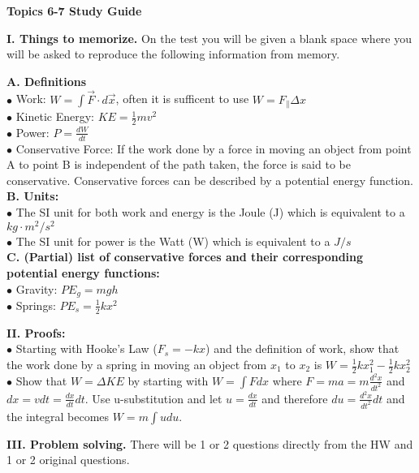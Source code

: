 \documentclass[11pt]{article}
\begin{document}
{\centering
\textbf{Topics 6-7 Study Guide} \par
\vspace{\baselineskip}
}

\textbf{I. Things to memorize.}
On the test you will be given a blank space where you will be asked to reproduce the following information from memory.
\vspace{0.5\baselineskip}

\begin{addmargin}[1em]{0em}%
\textbf{A. Definitions} \\
$\bullet$ Work: $W = \int \vec{F} \cdot d\vec{x}$, often it is sufficent to use $W = F_\parallel \Delta x$ \\
$\bullet$ Kinetic Energy: $KE = \frac{1}{2} m v^2$ \\
$\bullet$ Power: $P = \frac{dW}{dt}$ \\
$\bullet$ Conservative Force: If the work done by a force in moving an object from point A to point B is independent of the path taken, the force is said to be conservative. Conservative forces can be described by a potential energy function. \\

\textbf{B. Units:} \\
$\bullet$ The SI unit for both work and energy is the Joule (J) which is equivalent to a $kg \cdot m^2/s^2$ \\
$\bullet$ The SI unit for power is the Watt (W) which is equivalent to a $J/s$ \\

\textbf{C. (Partial) list of conservative forces and their corresponding potential energy functions:} \\
$\bullet$ Gravity: $PE_g = mgh$ \\
$\bullet$ Springs: $PE_s = \frac{1}{2}kx^2$
\end{addmargin}

\vspace{\baselineskip}
\textbf{II. Proofs:} \\
$\bullet$ Starting with Hooke's Law ($F_s = -kx$) and the definition of work, show that the work done by a spring in moving an object from $x_1$ to $x_2$ is $W = \frac{1}{2}kx_1^2 - \frac{1}{2}kx_2^2$ \\
$\bullet$ Show that $W = \Delta KE$ by starting with $W = \int F dx$ where $F = ma = m\frac{d^2x}{dt^2}$ and $dx = vdt = \frac{dx}{dt}dt$. Use u-substitution and let $u = \frac{dx}{dt}$ and therefore $du = \frac{d^2x}{dt^2}dt$ and the integral becomes $W = m \int u du$.

\vspace{\baselineskip}
\textbf{III. Problem solving.}
There will be 1 or 2 questions directly from the HW and 1 or 2 original questions.
\end{document}
